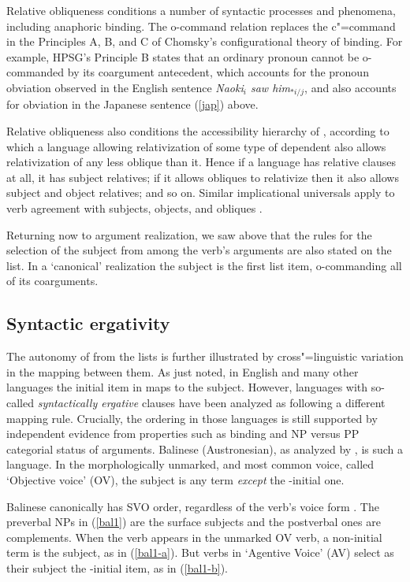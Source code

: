\documentclass[output=paper]{langsci/langscibook}
\begin{document}
Relative obliqueness conditions a number of syntactic processes and phenomena, including anaphoric binding.  The o-command relation replaces the c"=command in the Principles A, B, and C of Chomsky's \citeyearpar{Chomsky81a} configurational theory of binding.  For example, HPSG's Principle B states that an ordinary pronoun cannot be o-commanded by its coargument antecedent, which accounts for the pronoun obviation observed in the English sentence \textit{Naoki$_i$ saw him$_{*i/j}$}, and also accounts for obviation in the Japanese sentence (\ref{jap}) above.  

Relative obliqueness also conditions the accessibility hierarchy of \citet{KeenanandComrie1977}, according to which a language allowing relativization of some type of dependent also allows relativization of any less oblique than it.  Hence if a language has relative clauses at all, it has subject relatives; if it allows obliques to relativize then it also allows subject and object relatives; and so on.  
Similar implicational universals apply to verb agreement with subjects, objects, and obliques \citet{greenberg:1966}.  

Returning now to argument realization, we saw above that the rules for the selection of the subject from among the verb's arguments are also stated on the \argst list.  In a `canonical' realization the subject is the first list item, o-commanding all of its coarguments.  

\subsection{Syntactic ergativity}
The autonomy of \argst from the \val lists is further illustrated by cross"=linguistic variation in the mapping between them.  As just noted, in English and many other languages the initial item in \argst maps to the subject.  However,  languages with so-called \textit{syntactically ergative} clauses have been analyzed as following a different mapping rule.  Crucially, the \argst ordering in those languages is still supported by independent evidence from properties such as binding and NP versus PP categorial status of arguments.
Balinese (Austronesian), as analyzed by \citet{Wechsler+Arka:1998}, is such a language.  In the morphologically unmarked, and most common voice, called `Objective voice' (OV), the subject is any term \textit{except} the \argst-initial one.   

Balinese canonically has SVO order, regardless of the verb's voice form \citep{Artawa1994, Wechsler+Arka:1998}.  The preverbal NPs in  (\ref{bal1}) are the surface subjects and the postverbal ones are complements.  When the verb appears in the unmarked OV verb, a non-initial term is the subject, as in (\ref{bal1-a}).    But verbs in `Agentive Voice' (AV) select as their subject the \argst{}-initial item, as in (\ref{bal1-b}).  
\end{document}
